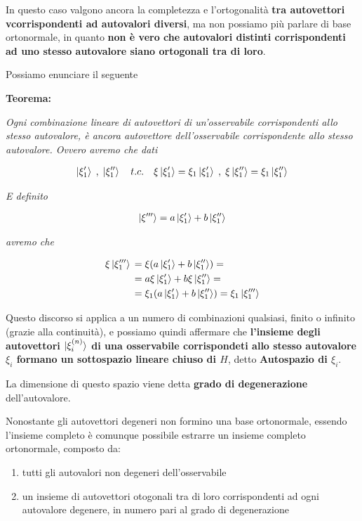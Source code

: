 In questo caso valgono ancora la completezza e l'ortogonalità \textbf{tra autovettori vcorrispondenti ad autovalori diversi}, ma non possiamo più parlare di base ortonormale, in quanto \textbf{non è vero che autovalori distinti corrispondenti ad uno stesso autovalore siano ortogonali tra di loro}.

Possiamo enunciare il seguente 

\bigskip

\textbf{Teorema:}

\textit{Ogni combinazione lineare di autovettori di un'osservabile corrispondenti allo stesso autovalore, è ancora autovettore dell'osservabile corrispondente allo stesso autovalore. Ovvero avremo che dati}

\begin{align}
\ket{\xi'_1} \;,\; \ket{\xi''_1} \quad t.c. \quad \xi\ket{\xi'_1}=\xi_1\ket{\xi'_1} \;,\; \xi\ket{\xi''_1}=\xi_1\ket{\xi''_1}
\end{align}

\textit{E definito}

\begin{align}
\ket{\xi'''}= a\ket{\xi'_1} + b\ket{\xi''_1}
\end{align}

\textit{avremo che}

\begin{align}
\xi\ket{\xi'''_1} {}&= \xi(a\ket{\xi'_1} + b\ket{\xi''_1})= \nonumber \\
&= a\xi\ket{\xi'_1} + b\xi\ket{\xi''_1}= \nonumber \\
&=\xi_1(a\ket{\xi'_1} + b\ket{\xi''_1}) = \xi_1 \ket{\xi'''_1}
\end{align}


\bigskip

Questo discorso si applica a un numero di combinazioni qualsiasi, finito o infinito (grazie alla continuità), e possiamo quindi affermare che \textbf{l'insieme degli autovettori $\ket{\xi^{(n)}_i}$ di una osservabile corrispondeti allo stesso autovalore $\xi_i$ formano un sottospazio lineare chiuso di $H$}, detto \textbf{Autospazio di $\xi_i$}.

La dimensione di questo spazio viene detta \textbf{grado di degenerazione} dell'autovalore.

Nonostante gli autovettori degeneri non formino una base ortonormale, essendo l'insieme completo è comunque possibile estrarre un insieme completo ortonormale, composto da:

\begin{enumerate}
	\item tutti gli autovalori non degeneri dell'osservabile
	\item un insieme di autovettori otogonali tra di loro corrispondenti ad ogni autovalore degenere, in numero pari al grado di degenerazione
\end{enumerate}

